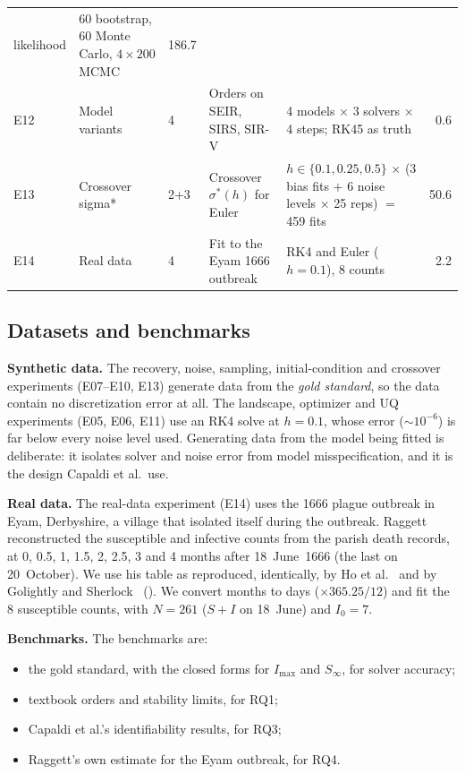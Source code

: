 \documentclass[sigconf]{acmart}
\begin{document}
\begin{table}[t]
\begin{tabularx}{\textwidth}{@{}l l l X X r@{}}
      likelihood & 60 bootstrap, 60 Monte Carlo, $4\times200$ MCMC & 186.7\\
    E12 & Model variants & 4 & Orders on SEIR, SIRS, SIR-V &
      4 models $\times$ 3 solvers $\times$ 4 steps; RK45 as truth & 0.6\\
    E13 & Crossover sigma* & 2+3 & Crossover $\sigma^*(h)$ for Euler &
      $h\in\{0.1,0.25,0.5\}$ $\times$ (3 bias fits $+$ 6 noise levels
      $\times$ 25 reps) $=$ 459 fits & 50.6\\
    E14 & Real data & 4 & Fit to the Eyam 1666 outbreak &
      RK4 and Euler ($h=0.1$), 8 counts & 2.2\\
    \bottomrule
  \end{tabularx}
\end{table}

\subsection{Datasets and benchmarks}
\textbf{Synthetic data.} The recovery, noise, sampling,
initial-condition and crossover experiments (E07--E10, E13) generate
data from the \emph{gold standard}, so the data contain no
discretization error at all. The landscape, optimizer and UQ experiments
(E05, E06, E11) use an RK4 solve at $h=0.1$, whose error ($\sim10^{-6}$)
is far below every noise level used. Generating data from the model
being fitted is deliberate: it isolates solver and noise error from
model misspecification, and it is the design Capaldi et al.\ use.

\textbf{Real data.} The real-data experiment (E14) uses the 1666 plague
outbreak in Eyam, Derbyshire, a village that isolated itself during the
outbreak. Raggett~\cite{raggett1982} reconstructed the susceptible and
infective counts from the parish death records, at 0, 0.5, 1, 1.5, 2,
2.5, 3 and 4 months after 18~June~1666 (the last on 20~October). We use
his table as reproduced, identically, by Ho et
al.~\cite{ho2017} and by Golightly and Sherlock~\cite{golightly2019}
(). We convert months to days
($\times365.25/12$) and fit the 8 susceptible counts, with $N=261$
($S+I$ on 18~June) and $I_0=7$.

\textbf{Benchmarks.} The benchmarks are:
\begin{itemize}
  \item the gold standard, with the closed forms for $I_{\max}$ and
    $S_\infty$, for solver accuracy;
  \item textbook orders and stability limits, for RQ1;
  \item Capaldi et al.'s identifiability results, for RQ3;
  \item Raggett's own estimate for the Eyam outbreak, for RQ4.
\end{itemize}
\end{document}
